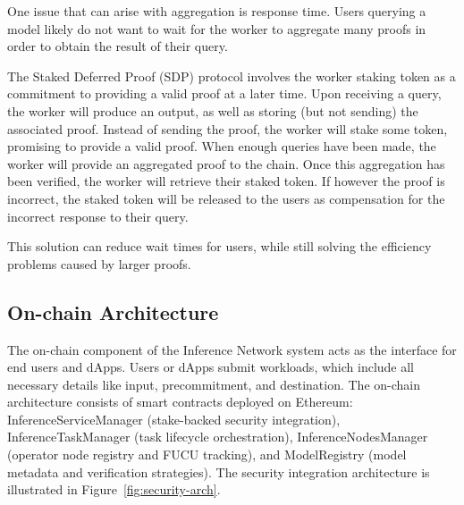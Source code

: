 \documentclass[conference]{IEEEtran}
\begin{document}
One issue that can arise with aggregation is response time.
Users querying a model likely do not want to wait for the worker to aggregate many proofs in order to obtain the result of their query.


The Staked Deferred Proof (SDP) protocol involves the worker staking token as a commitment to providing a valid proof at a later time. Upon receiving a query, the worker will produce an output, as well as storing (but not sending) the associated proof. Instead of sending the proof, the worker will stake some token, promising to provide a valid proof. When enough queries have been made, the worker will provide an aggregated proof to the chain. Once this aggregation has been verified, the worker will retrieve their staked token. If however the proof is incorrect, the staked token will be released to the users as compensation for the incorrect response to their query.

This solution can reduce wait times for users, while still solving the efficiency problems caused by larger proofs.

\subsection{On-chain Architecture}

The on-chain component of the Inference Network system acts as the interface for end users and dApps.  Users or dApps submit workloads, which include all necessary details like input, precommitment, and destination. The on-chain architecture consists of smart contracts deployed on Ethereum: InferenceServiceManager (stake-backed security integration), InferenceTaskManager (task lifecycle orchestration), InferenceNodesManager (operator node registry and FUCU tracking), and ModelRegistry (model metadata and verification strategies). The security integration architecture is illustrated in Figure~\ref{fig:security-arch}.
\end{document}
